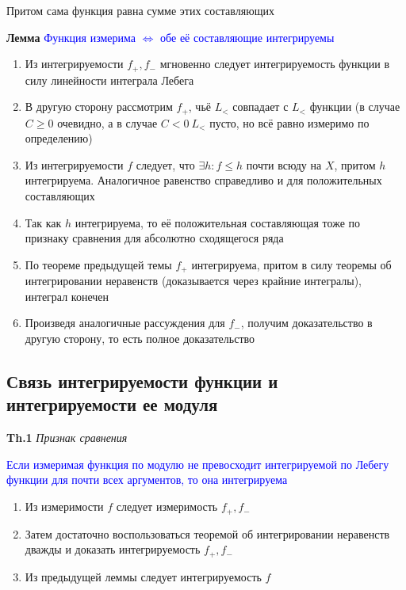 Притом сама функция равна сумме этих составляющих

\textbf{Лемма} \textcolor{blue}{Функция измерима $\Leftrightarrow$ обе её составляющие интегрируемы}

\begin{enumerate}
    \item Из интегрируемости $f_+, f_-$ мгновенно следует интегрируемость функции в силу линейности интеграла Лебега
    \item В другую сторону рассмотрим $f_+$, чьё $L_<$ совпадает с $L_<$ функции (в случае $C \geq 0$ очевидно, а в
    случае $C < 0~L_<$ пусто, но всё равно измеримо по определению)
    \item Из интегрируемости $f$ следует, что $\exists h: f \leq h$ почти всюду на $X$, притом $h$ интегрируема.
    Аналогичное
    равенство
    справедливо и для положительных составляющих
    \item Так как $h$ интегрируема, то её положительная составляющая тоже по признаку сравнения для абсолютно
    сходящегося ряда
    \item По теореме предыдущей темы $f_+$ интегрируема, притом в силу теоремы об интегрировании неравенств
    (доказывается через крайние интегралы), интеграл конечен
    \item Произведя аналогичные рассуждения для $f_-$, получим доказательство в другую сторону, то есть полное
    доказательство
\end{enumerate}

\subsection{Связь интегрируемости функции и интегрируемости ее модуля}

\textbf{Th.1} \textit{Признак сравнения}

\textcolor{blue}{Если измеримая функция по модулю не превосходит интегрируемой по Лебегу функции для почти всех
аргументов, то она интегрируема}

\begin{enumerate}
    \item Из измеримости $f$ следует измеримость $f_+, f_-$
    \item Затем достаточно воспользоваться теоремой об интегрировании неравенств дважды и доказать
    интегрируемость $f_+, f_-$
    \item Из предыдущей леммы следует интегрируемость $f$
\end{enumerate}

